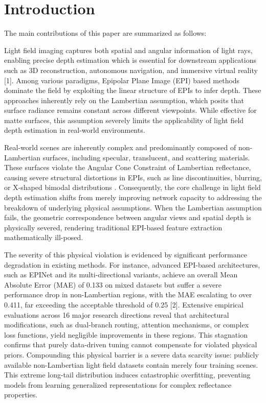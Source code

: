 \section{Introduction}

The main contributions of this paper are summarized as follows:

Light field imaging captures both spatial and angular information of light rays, enabling precise depth estimation which is essential for downstream applications such as 3D reconstruction, autonomous navigation, and immersive virtual reality [1]. Among various paradigms, Epipolar Plane Image (EPI) based methods dominate the field by exploiting the linear structure of EPIs to infer depth. These approaches inherently rely on the Lambertian assumption, which posits that surface radiance remains constant across different viewpoints. While effective for matte surfaces, this assumption severely limits the applicability of light field depth estimation in real-world environments.

Real-world scenes are inherently complex and predominantly composed of non-Lambertian surfaces, including specular, translucent, and scattering materials. These surfaces violate the Angular Cone Constraint of Lambertian reflectance, causing severe structural distortions in EPIs, such as line discontinuities, blurring, or X-shaped bimodal distributions . Consequently, the core challenge in light field depth estimation shifts from merely improving network capacity to addressing the breakdown of underlying physical assumptions. When the Lambertian assumption fails, the geometric correspondence between angular views and spatial depth is physically severed, rendering traditional EPI-based feature extraction mathematically ill-posed.

The severity of this physical violation is evidenced by significant performance degradation in existing methods. For instance, advanced EPI-based architectures, such as EPINet and its multi-directional variants, achieve an overall Mean Absolute Error (MAE) of 0.133 on mixed datasets but suffer a severe performance drop in non-Lambertian regions, with the MAE escalating to over 0.411, far exceeding the acceptable threshold of 0.25 [2]. Extensive empirical evaluations across 16 major research directions reveal that architectural modifications, such as dual-branch routing, attention mechanisms, or complex loss functions, yield negligible improvements in these regions. This stagnation confirms that purely data-driven tuning cannot compensate for violated physical priors. Compounding this physical barrier is a severe data scarcity issue: publicly available non-Lambertian light field datasets contain merely four training scenes. This extreme long-tail distribution induces catastrophic overfitting, preventing models from learning generalized representations for complex reflectance properties.

